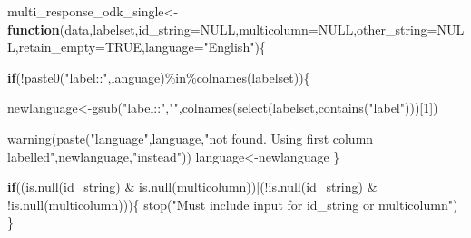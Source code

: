 \documentclass[
  letterpaper,
  DIV=11,
  numbers=noendperiod]{scrreprt}
\newenvironment{Shaded}{\begin{snugshade}}{\end{snugshade}}
\newcommand{\AttributeTok}[1]{\textcolor[rgb]{0.40,0.45,0.13}{#1}}
\newcommand{\ConstantTok}[1]{\textcolor[rgb]{0.56,0.35,0.01}{#1}}
\newcommand{\ControlFlowTok}[1]{\textcolor[rgb]{0.00,0.23,0.31}{\textbf{#1}}}
\newcommand{\DecValTok}[1]{\textcolor[rgb]{0.68,0.00,0.00}{#1}}
\newcommand{\FunctionTok}[1]{\textcolor[rgb]{0.28,0.35,0.67}{#1}}
\newcommand{\NormalTok}[1]{\textcolor[rgb]{0.00,0.23,0.31}{#1}}
\newcommand{\OtherTok}[1]{\textcolor[rgb]{0.00,0.23,0.31}{#1}}
\newcommand{\SpecialCharTok}[1]{\textcolor[rgb]{0.37,0.37,0.37}{#1}}
\newcommand{\StringTok}[1]{\textcolor[rgb]{0.13,0.47,0.30}{#1}}
\begin{document}
\begin{Shaded}
\begin{Highlighting}[]
\NormalTok{multi\_response\_odk\_single}\OtherTok{\textless{}{-}}\ControlFlowTok{function}\NormalTok{(data,labelset,}\AttributeTok{id\_string=}\ConstantTok{NULL}\NormalTok{,}\AttributeTok{multicolumn=}\ConstantTok{NULL}\NormalTok{,}\AttributeTok{other\_string=}\ConstantTok{NULL}\NormalTok{,}\AttributeTok{retain\_empty=}\ConstantTok{TRUE}\NormalTok{,}\AttributeTok{language=}\StringTok{"English"}\NormalTok{)\{}
  
  \ControlFlowTok{if}\NormalTok{(}\SpecialCharTok{!}\FunctionTok{paste0}\NormalTok{(}\StringTok{"label::"}\NormalTok{,language)}\SpecialCharTok{\%in\%}\FunctionTok{colnames}\NormalTok{(labelset))\{}
    
\NormalTok{    newlanguage}\OtherTok{\textless{}{-}}\FunctionTok{gsub}\NormalTok{(}\StringTok{"label::"}\NormalTok{,}\StringTok{""}\NormalTok{,}\FunctionTok{colnames}\NormalTok{(}\FunctionTok{select}\NormalTok{(labelset,}\FunctionTok{contains}\NormalTok{(}\StringTok{"label"}\NormalTok{)))[}\DecValTok{1}\NormalTok{])}
    
    \FunctionTok{warning}\NormalTok{(}\FunctionTok{paste}\NormalTok{(}\StringTok{"language"}\NormalTok{,language,}\StringTok{"not found. Using first column labelled"}\NormalTok{,newlanguage,}\StringTok{"instead"}\NormalTok{))}
\NormalTok{    language}\OtherTok{\textless{}{-}}\NormalTok{newlanguage}
\NormalTok{  \}}
  
  \ControlFlowTok{if}\NormalTok{((}\FunctionTok{is.null}\NormalTok{(id\_string) }\SpecialCharTok{\&} \FunctionTok{is.null}\NormalTok{(multicolumn))}\SpecialCharTok{|}\NormalTok{(}\SpecialCharTok{!}\FunctionTok{is.null}\NormalTok{(id\_string) }\SpecialCharTok{\&} \SpecialCharTok{!}\FunctionTok{is.null}\NormalTok{(multicolumn)))\{}
    \FunctionTok{stop}\NormalTok{(}\StringTok{"Must include input for id\_string or multicolumn"}\NormalTok{)}
\NormalTok{  \}}
  

\end{Highlighting}
\end{Shaded}
\end{document}
